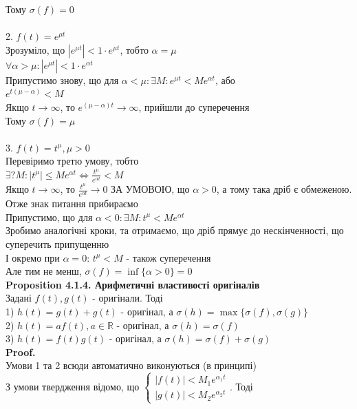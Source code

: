 \documentclass{math_library}
\begin{document}
Тому $\sigma(f) = 0$\\
\\
2. $f(t) = e^{\mu t}$\\
Зрозуміло, що $|e^{\mu t}| < 1\cdot e^{\mu t}$, тобто $\alpha = \mu$\\
$\forall \alpha > \mu: |e^{\mu t}| < 1\cdot e^{\alpha t}$\\
Припустимо знову, що для $\alpha < \mu: \exists M: e^{\mu t} < M e^{\alpha t}$, або\\
$e^{t(\mu - \alpha)} < M$\\
Якщо $t \to \infty$, то $e^{(\mu-\alpha)t} \to \infty$, прийшли до суперечення\\
Тому $\sigma(f) = \mu$\\
\\
3. $f(t) = t^{\mu}, \mu>0$\\
Перевіримо третю умову, тобто\\
$\displaystyle \exists? M: |t^{\mu}| \leq Me^{\alpha t} \iff \frac{t^{\mu}}{e^{\alpha t}} < M$\\
Якщо $t \to \infty$, то $\displaystyle \frac{t^{\mu}}{e^{\alpha t}} \to 0$ ЗА УМОВОЮ, що $\alpha > 0$, а тому така дріб є обмеженою. Отже знак питання прибираємо\\
Припустимо, що для $\alpha<0: \exists M: t^{\mu} < Me^{\alpha t}$\\
Зробимо аналогічні кроки, та отримаємо, що дріб прямує до нескінченності, що суперечить припущенню\\
І окремо при $\alpha = 0$: $t^{\mu} < M$ - також суперечення\\
Але тим не менш, $\sigma(f) = \inf\{\alpha > 0\} = 0$
\bigskip \\
\textbf{Proposition 4.1.4. Арифметичні властивості оригіналів}\\
Задані $f(t), g(t)$ - оригінали. Тоді\\
1) $h(t) = g(t)+g(t)$ - оригінал, а $\sigma(h)=\max\{\sigma(f),\sigma(g)\}$\\
2) $h(t) = af(t), a \in \mathbb{R}$ - оригінал, а $\sigma(h)=\sigma(f)$\\
3) $h(t) = f(t) g(t)$ - оригінал, а $\sigma(h)= \sigma(f) + \sigma(g)$\\
\textbf{Proof.}\\
Умови 1 та 2 всюди автоматично виконуються (в принципі)\\
З умови твердження відомо, що $\begin{cases} |f(t)| < M_1 e^{\alpha_1 t} \\ |g(t)| < M_2 e^{\alpha_2 t} \end{cases}$. Тоді\\
\end{document}
